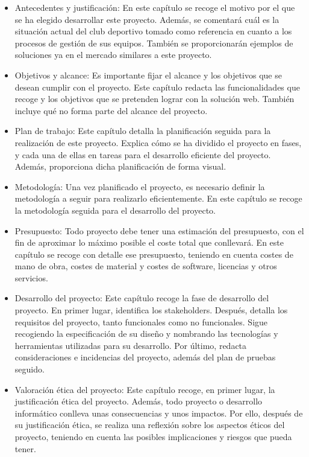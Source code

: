 \begin{itemize}
  \item Antecedentes y justificación: En este capítulo se recoge el motivo por el que se ha elegido desarrollar este proyecto. Además, se comentará cuál es la situación actual del club deportivo tomado como referencia en cuanto a los procesos de gestión de sus equipos. También se proporcionarán ejemplos de soluciones ya en el mercado similares a este proyecto.
  \item Objetivos y alcance: Es importante fijar el alcance y los objetivos que se desean cumplir con el proyecto. Este capítulo redacta las funcionalidades que recoge y los objetivos que se pretenden lograr con la solución web. También incluye qué no forma parte del alcance del proyecto.
  \item Plan de trabajo: Este capítulo detalla la planificación seguida para la realización de este proyecto. Explica cómo se ha dividido el proyecto en fases, y cada una de ellas en tareas para el desarrollo eficiente del proyecto. Además, proporciona dicha planificación de forma visual.
  \item Metodología: Una vez planificado el proyecto, es necesario definir la metodología a seguir para realizarlo eficientemente. En este capítulo se recoge la metodología seguida para el desarrollo del proyecto.
  \item Presupuesto: Todo proyecto debe tener una estimación del presupuesto, con el fin de aproximar lo máximo posible el coste total que conllevará. En este capítulo se recoge con detalle ese presupuesto, teniendo en cuenta costes de mano de obra, costes de material y costes de software, licencias y otros servicios.
  \item Desarrollo del proyecto: Este capítulo recoge la fase de desarrollo del proyecto. En primer lugar, identifica los stakeholders. Después, detalla los requisitos del proyecto, tanto funcionales como no funcionales. Sigue recogiendo la especificación de su diseño y nombrando las tecnologías y herramientas utilizadas para su desarrollo. Por último, redacta consideraciones e incidencias del proyecto, además del plan de pruebas seguido.
  \item Valoración ética del proyecto: Este capítulo recoge, en primer lugar, la justificación ética del proyecto. Además, todo proyecto o desarrollo informático conlleva unas consecuencias y unos impactos. Por ello, después de su justificación ética, se realiza una reflexión sobre los aspectos éticos del proyecto, teniendo en cuenta las posibles implicaciones y riesgos que pueda tener.

\end{itemize}
